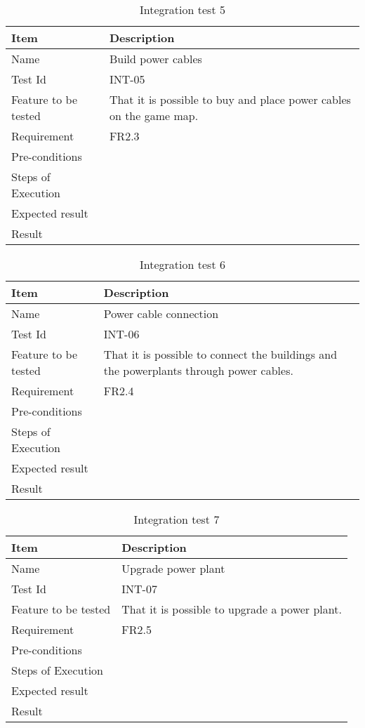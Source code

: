 \begin{table}[H]
\centering
	\begin{tabular}{ l | p{8cm} }
		\hline
		{\bf Item} & {\bf Description} \\ \hline
		Name & Build power cables \\ 
		Test Id & INT-05\\ 
		Feature to be tested &  That it is possible to buy and place power cables on the game map. \\ 
		Requirement & FR2.3 \\ 
		Pre-conditions & \\ 
		Steps of Execution & \\ 
		Expected result & \\ 
		Result & \\ 
	\end{tabular}
	\caption{Integration test 5}
\end{table}

\begin{table}[H]
\centering
	\begin{tabular}{ l | p{8cm} }
		\hline
		{\bf Item} & {\bf Description} \\ \hline
		Name & Power cable connection \\ 
		Test Id & INT-06\\ 
		Feature to be tested & That it is possible to connect the buildings and the powerplants through power cables. \\ 
		Requirement & FR2.4 \\ 
		Pre-conditions & \\ 
		Steps of Execution & \\ 
		Expected result & \\ 
		Result & \\ 
	\end{tabular}
	\caption{Integration test 6}
\end{table}

\begin{table}[H]
\centering
	\begin{tabular}{ l | p{8cm} }
		\hline
		{\bf Item} & {\bf Description} \\ \hline
		Name & Upgrade power plant\\ 
		Test Id & INT-07 \\ 
		Feature to be tested & That it is possible to upgrade a power plant. \\ 
		Requirement & FR2.5 \\ 
		Pre-conditions & \\ 
		Steps of Execution & \\ 
		Expected result & \\ 
		Result & \\ 
	\end{tabular}
	\caption{Integration test 7}
\end{table}

